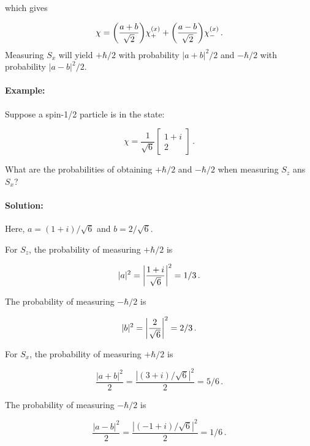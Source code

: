 \documentclass[12pt, titlepage]{article}
\begin{document}
which gives

\begin{equation}
	\chi = \qty(\frac{a+b}{\sqrt{2}})\chi_+^{(x)} + \qty(\frac{a-b}{\sqrt{2}})\chi_-^{(x)} \,.
\end{equation}
Measuring $S_x$ will yield $+\hbar/2$ with probability $|a+b|^2/2$ and $-\hbar/2$ with probability $|a-b|^2/2$.
\clearpage

\begin{mdframed}[backgroundcolor=gray!20]
\paragraph*{Example:}
Suppose a spin-1/2 particle is in the state:

\begin{equation*}
	\chi = \frac{1}{\sqrt{6}} \begin{bmatrix} 1+i \\ 2 \end{bmatrix} \,.
\end{equation*}

What are the probabilities of obtaining $+\hbar/2$ and $-\hbar/2$ when measuring $S_z$ ans $S_x$?

\paragraph*{Solution:}
Here, $a = (1+i)/\sqrt{6}$ and $b = 2/\sqrt{6}$. 

For $S_z$, the probability of measuring $+\hbar/2$ is 

\begin{equation*}
	|a|^2 = \qty|\frac{1+i}{\sqrt{6}}|^2 = 1/3 \,.
\end{equation*}

The probability of measuring $-\hbar/2$ is

\begin{equation*}
	|b|^2 = \qty|\frac{2}{\sqrt{6}}|^2 = 2/3 \,.
\end{equation*}

For $S_x$, the probability of measuring $+\hbar/2$ is 

\begin{equation*}
	\frac{|a+b|^2}{2} = \frac{|(3+i)/\sqrt{6}|^2}{2} = 5/6 \,.
\end{equation*}

The probability of measuring $-\hbar/2$ is

\begin{equation*}
	\frac{|a-b|^2}{2} = \frac{|(-1+i)/\sqrt{6}|^2}{2} = 1/6 \,.
\end{equation*}
\end{mdframed}
\end{document}
